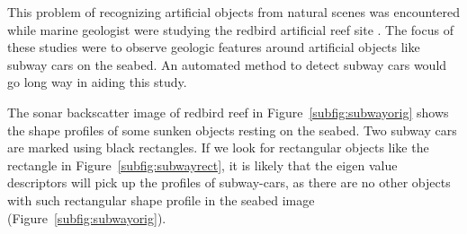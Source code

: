 \documentclass {udthesis}
\begin{document}
This problem of recognizing artificial objects from natural scenes was encountered while marine geologist were studying the redbird artificial reef site \cite{redbird_nicole, redbird_art}. The focus of these studies were to observe geologic features around artificial objects like subway cars on the seabed. An automated method to detect subway cars would go long way in aiding this study. 

\begin{figure}
\vskip -20pt
\caption{}
\end{figure}

The sonar backscatter image of redbird reef in Figure~\ref{subfig:subwayorig} shows the shape profiles of some sunken objects resting on the seabed. Two subway cars are marked using black rectangles. If we look for rectangular objects like the rectangle in Figure~\ref{subfig:subwayrect}, it is likely that the eigen value descriptors will pick up the profiles of subway-cars, as there are no other objects with such rectangular shape profile in the seabed image (Figure~\ref{subfig:subwayorig}). 
\end{document}
